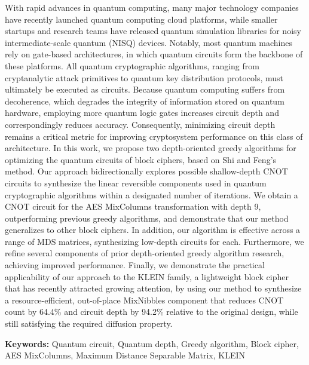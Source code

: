 With rapid advances in quantum computing, many major technology companies
have recently launched quantum computing cloud platforms, while smaller
startups and research teams have released quantum simulation libraries for
noisy intermediate-scale quantum (NISQ) devices. Notably, most quantum
machines rely on gate-based architectures, in which quantum circuits form
the backbone of these platforms. All quantum cryptographic algorithms,
ranging from cryptanalytic attack primitives to quantum key distribution
protocols, must ultimately be executed as circuits. Because quantum
computing suffers from decoherence, which degrades the integrity of
information stored on quantum hardware, employing more quantum logic gates
increases circuit depth and correspondingly reduces accuracy. Consequently,
minimizing circuit depth remains a critical metric for improving
cryptosystem performance on this class of architecture. In this work, we propose two depth-oriented greedy algorithms for optimizing
the quantum circuits of block ciphers, based on Shi and Feng's
method. Our approach bidirectionally explores possible shallow-depth CNOT
circuits to synthesize the linear reversible components used in quantum
cryptographic algorithms within a designated number of iterations. We obtain
a CNOT circuit for the AES MixColumns transformation with depth 9,
outperforming previous greedy algorithms, and demonstrate that our method
generalizes to other block ciphers. In addition, our algorithm is effective
across a range of MDS matrices, synthesizing low-depth circuits for each.
Furthermore, we refine several components of prior depth-oriented greedy
algorithm research, achieving improved performance. Finally, we demonstrate
the practical applicability of our approach to the KLEIN family, a
lightweight block cipher that has recently attracted growing attention, by
using our method to synthesize a resource-efficient, out-of-place MixNibbles
component that reduces CNOT count by 64.4\% and circuit depth by 94.2\%
relative to the original design, while still satisfying the required
diffusion property.

\medskip
\textbf{Keywords:} Quantum circuit, Quantum depth, Greedy algorithm, Block cipher, AES MixColumns, Maximum Distance Separable Matrix, KLEIN